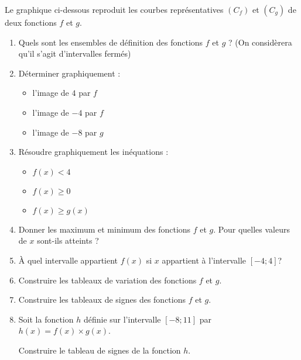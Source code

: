 
%
Le graphique ci-dessous reproduit les courbes représentatives $(C_f)$ et $(C_g)$ de deux fonctions $f$ et $g$.
\begin{enumerate}
     \item
     Quels sont les ensembles de définition des fonctions $f$ et $g$ ? (On considèrera qu'il s'agit d'intervalles fermés)
     \item
     Déterminer graphiquement :
     \begin{itemize}
          \item
          l'image de $4$ par $f$
          \item
          l'image de $-4$ par $f$
          \item
          l'image de $-8$ par $g$
     \end{itemize}
     \item
     Résoudre graphiquement les inéquations :
     \begin{itemize}
          \item
          $f(x)  < 4$
          \item
          $f(x) \geqslant 0$
          \item
          $f(x) \geqslant g(x)$
     \end{itemize}
     \item
     Donner les maximum et minimum des fonctions $f$ et $g$. Pour quelles valeurs de $x$ sont-ils atteints ?
     \item
     À quel intervalle appartient $f(x)$ si $x$ appartient à l'intervalle $[-4 ; 4]$?
     \item
     Construire les tableaux de variation des fonctions $f$ et $g$.
     \item
     Construire les tableaux de signes des fonctions $f$ et $g$.
     \item
     Soit la fonction $h$ définie sur l'intervalle $[-8;11]$ par $h(x)=f(x) \times g(x)$.
     \par
     Construire le tableau de signes de la fonction $h$.
\end{enumerate}
